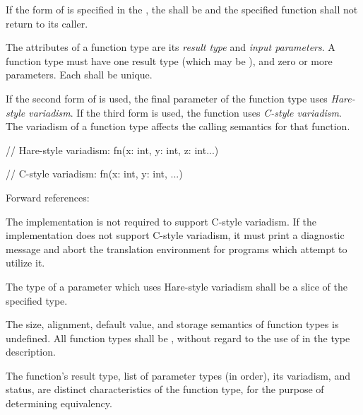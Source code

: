 \specsubsubitem
If the  form of  is specified in
the , the  shall be
 and the specified function shall not return to its caller.

\specsubsubitem
The attributes of a function type are its \textit{result type} and
\textit{input parameters}. A function type must have one result type (which may
be ), and zero or more parameters. Each  shall
be unique.

\specsubsubitem
If the second form of  is used, the final parameter of
the function type uses \textit{Hare-style variadism}. If the third form is
used, the function uses \textit{C-style variadism}. The variadism of a function
type affects the calling semantics for that function.

\begin{codesample}
// Hare-style variadism:
fn(x: int, y: int, z: int...)

// C-style variadism:
fn(x: int, y: int, ...)
\end{codesample}

Forward references: 

\specsubsubitem
The implementation is not required to support C-style variadism. If the
implementation does not support C-style variadism, it must print a diagnostic
message and abort the translation environment for programs which attempt to
utilize it.

\specsubsubitem
The type of a parameter which uses Hare-style variadism shall be a slice of the
specified type.


\specsubsubitem
The size, alignment, default value, and storage semantics of function types is
undefined. All function types shall be , without regard to the
use of  in the type description.

\specsubsubitem
The function's result type, list of parameter types (in order), its variadism,
and  status, are distinct characteristics of the function
type, for the purpose of determining equivalency.


\begin{grammar}
 \\
	 \\

 \\
	  \\
\end{grammar}

